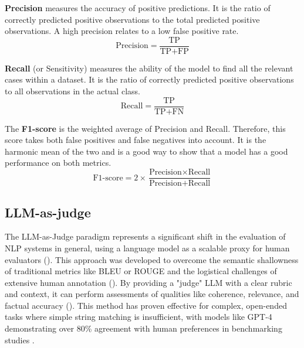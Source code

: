                 \textbf{Precision} measures the accuracy of positive predictions. It is the ratio of correctly predicted positive observations to the total predicted positive observations. A high precision relates to a low false positive rate.
                \begin{equation}
                    \text{Precision} = \frac{\text{TP}}{\text{TP} + \text{FP}}
                    \label{eq:precision}
                \end{equation}

                \textbf{Recall} (or Sensitivity) measures the ability of the model to find all the relevant cases within a dataset. It is the ratio of correctly predicted positive observations to all observations in the actual class.
                \begin{equation}
                    \text{Recall} = \frac{\text{TP}}{\text{TP} + \text{FN}}
                    \label{eq:recall}
                \end{equation}

                The \textbf{F1-score} is the weighted average of Precision and Recall. Therefore, this score takes both false positives and false negatives into account. It is the harmonic mean of the two and is a good way to show that a model has a good performance on both metrics.
                \begin{equation}
                    \text{F1-score} = 2 \times \frac{\text{Precision} \times \text{Recall}}{\text{Precision} + \text{Recall}}
                    \label{eq:f1-score}
                \end{equation}


        \subsection{LLM-as-judge}


            The LLM-as-Judge paradigm represents a significant shift in the evaluation of NLP systems in general, using a language model as a scalable proxy for human evaluators (\citep{li2024llmsasjudgescomprehensivesurveyllmbased}). 
            This approach was developed to overcome the semantic shallowness of traditional metrics like BLEU or ROUGE and the logistical challenges of extensive human annotation (\citep{Zheng2023}). 
            By providing a "judge" LLM with a clear rubric and context, it can perform assessments of qualities like coherence, relevance, and factual accuracy (\citep{li2024llmsasjudgescomprehensivesurveyllmbased}).
            This method has proven effective for complex, open-ended tasks where simple string matching is insufficient, with models like GPT-4 demonstrating over 80\% agreement with human preferences in benchmarking studies \citep{Zheng2023}.

